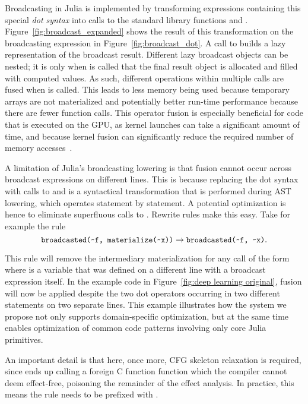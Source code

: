 Broadcasting in Julia is implemented by transforming expressions containing this special \emph{dot syntax} into calls to the standard library functions  and .
Figure~\ref{fig:broadcast_expanded} shows the result of this transformation on the broadcasting expression in Figure~\ref{fig:broadcast_dot}.
A call to  builds a lazy representation of the broadcast result. Different lazy broadcast objects can be nested; it is only when  is called that the final result object is allocated and filled with computed values.
As such, different operations within multiple  calls are fused when  is called.
This leads to less memory being used because temporary arrays are not materialized and potentially better run-time performance because there are fewer function calls.
This operator fusion is especially beneficial for code that is executed on the GPU, as kernel launches can take a significant amount of time, and because kernel fusion can significantly reduce the required number of memory accesses~\cite{besardEffectiveExtensibleProgramming2019}. 

A limitation of Julia's broadcasting lowering is that fusion cannot occur across broadcast expressions on different lines.
This is because replacing the dot syntax with calls to  and  is a syntactical transformation that is performed during AST lowering, which operates statement by statement. A potential optimization is hence to eliminate superfluous calls to .
Rewrite rules make this easy.
Take for example the rule
$$ \code{broadcasted(\char`\~f, materialize(\char`\~x))} \rightarrow \code{broadcasted(\char`\~f, \char`\~x)}.$$

This rule will remove the intermediary materialization for any call of the form  where  is a variable that was defined on a different line with a broadcast expression itself.
In the example code in Figure~\ref{fig:deep learning original}, fusion will now be applied despite the two dot operators occurring in two different statements on two separate lines. This example illustrates how the system we propose not only supports domain-specific optimization, but at the same time enables optimization of common code patterns involving only core Julia primitives. 

An important detail is that here, once more, CFG skeleton relaxation is required, since  ends up calling a foreign C function function which the compiler cannot deem effect-free, poisoning the remainder of the effect analysis.
In practice, this means the rule needs to be prefixed with .

